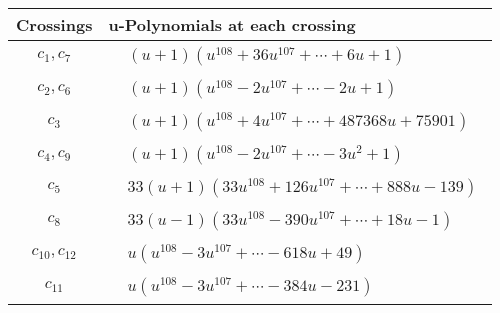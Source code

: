 \documentclass[1p]{elsarticle_modified}
\theoremstyle{definition}
\begin{document}
\begin{tabular}{m{50pt}|m{274pt}}
Crossings & \hspace{64pt}u-Polynomials at each crossing \\
\hline $$\begin{aligned}c_{1},c_{7}\end{aligned}$$&$\begin{aligned}
&(u+1)(u^{108}+36 u^{107}+\cdots+6 u+1)
\end{aligned}$\\
\hline $$\begin{aligned}c_{2},c_{6}\end{aligned}$$&$\begin{aligned}
&(u+1)(u^{108}-2 u^{107}+\cdots-2 u+1)
\end{aligned}$\\
\hline $$\begin{aligned}c_{3}\end{aligned}$$&$\begin{aligned}
&(u+1)(u^{108}+4 u^{107}+\cdots+487368 u+75901)
\end{aligned}$\\
\hline $$\begin{aligned}c_{4},c_{9}\end{aligned}$$&$\begin{aligned}
&(u+1)(u^{108}-2 u^{107}+\cdots-3 u^2+1)
\end{aligned}$\\
\hline $$\begin{aligned}c_{5}\end{aligned}$$&$\begin{aligned}
&33(u+1)(33 u^{108}+126 u^{107}+\cdots+888 u-139)
\end{aligned}$\\
\hline $$\begin{aligned}c_{8}\end{aligned}$$&$\begin{aligned}
&33(u-1)(33 u^{108}-390 u^{107}+\cdots+18 u-1)
\end{aligned}$\\
\hline $$\begin{aligned}c_{10},c_{12}\end{aligned}$$&$\begin{aligned}
&u(u^{108}-3 u^{107}+\cdots-618 u+49)
\end{aligned}$\\
\hline $$\begin{aligned}c_{11}\end{aligned}$$&$\begin{aligned}
&u(u^{108}-3 u^{107}+\cdots-384 u-231)
\end{aligned}$\\
\hline
\end{tabular}\newpage\renewcommand{\arraystretch}{1}
\end{document}
